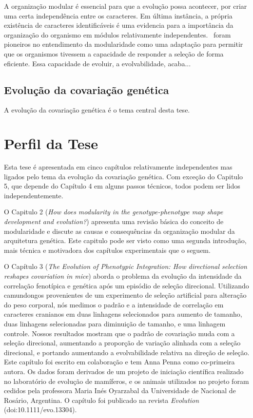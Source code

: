 \begin{refsection}
A organização modular é essencial para que a evolução possa acontecer, por
criar uma certa independência entre os caracteres. Em última instância, a
própria existência de caracteres identificáveis é uma evidencia para a
importância da organização do organismo em módulos relativamente
independentes.~\textcite{Wagner1996-ui} foram pioneiros no entendimento da
modularidade como uma adaptação para permitir que os organismos tivessem a
capacidade de responder a seleção de forma eficiente. Essa capacidade de
evoluir, a evolvabilidade, acaba...

\subsection{Evolução da covariação genética}

A evolução da covariação genética é o tema central desta tese.

\section{Perfil da Tese}

Esta tese é apresentada em cinco capítulos relativamente independentes mas
ligados pelo tema da evolução da covariação genética. Com exceção do Capitulo
5, que depende do Capítulo 4 em alguns passos técnicos, todos podem ser lidos
independentemente. 

O Capitulo 2 (\textit{How does modularity in the genotype-phenotype map shape
development and evolution?}) apresenta uma revisão básica do conceito de
modularidade e discute as causas e consequências da organização modular da
arquitetura genética. Este capitulo pode ser visto como uma segunda
introdução, mais técnica e motivadora dos capítulos experimentais que o seguem.

O Capítulo 3 (\textit{The Evolution of Phenotypic Integration: How directional
selection reshapes covariation in mice}) aborda o problema da evolução da
intensidade da correlação fenotípica e genética após um episódio de seleção
direcional. Utilizando camundongos provenientes de um experimento de seleção
artificial para alteração do peso corporal, nós medimos o padrão e a
intensidade de correlação em caracteres cranianos em duas linhagens
selecionados para aumento de tamanho, duas linhagens selecionadas para
diminuição de tamanho, e uma linhagem controle. Nossos resultados mostram que
o padrão de covariação muda com a seleção direcional, aumentando a proporção
de variação alinhada com a seleção direcional, e portando aumentando a
evolvabilidade relativa na direção de seleção. Este capítulo foi escrito em
colaboração e tem Anna Penna como co-primeira autora. Os dados foram derivados
de um projeto de iniciação científica realizado no laboratório de evolução de
mamíferos, e os animais utilizados no projeto foram cedidos pela professora
Maria Inés Oyarzabal da Universidade de Nacional de Rosário, Argentina. O
capítulo foi publicado na revista \textit{Evolution} (doi:10.1111/evo.13304).


\end{refsection}

